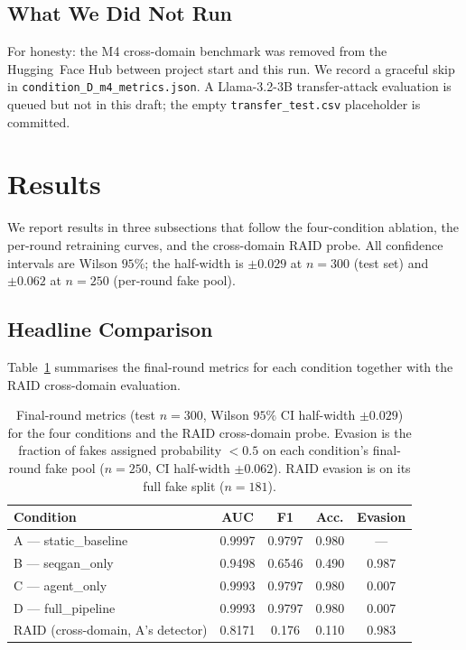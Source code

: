 \documentclass[conference]{IEEEtran}
\begin{document}
\subsection{What We Did Not Run}
For honesty: the M4 \cite{wang2024m4} cross-domain benchmark was removed
from the Hugging~Face Hub between project start and this run. We record a
graceful skip in \texttt{condition\_D\_m4\_metrics.json}. A
Llama-3.2-3B transfer-attack evaluation is queued but not in this draft;
the empty \texttt{transfer\_test.csv} placeholder is committed.

\section{Results}
\label{sec:results}

We report results in three subsections that follow the four-condition
ablation, the per-round retraining curves, and the cross-domain RAID
probe. All confidence intervals are Wilson \(95\%\); the half-width is
\(\pm 0.029\) at \(n = 300\) (test set) and \(\pm 0.062\) at
\(n = 250\) (per-round fake pool).

\subsection{Headline Comparison}
\label{ssec:headline}

Table~\ref{tab:headline} summarises the final-round metrics for each
condition together with the RAID cross-domain evaluation.

\begin{table}[t]
\caption{Final-round metrics (test \(n=300\), Wilson \(95\%\) CI half-width
\(\pm 0.029\)) for the four conditions and the RAID cross-domain probe.
Evasion is the fraction of fakes assigned probability $<0.5$ on each
condition's final-round fake pool (\(n=250\), CI half-width \(\pm 0.062\)).
RAID evasion is on its full fake split (\(n=181\)).}
\label{tab:headline}
\centering
\renewcommand{\arraystretch}{1.15}
\begin{tabular}{@{}lcccc@{}}
\toprule
\textbf{Condition} & \textbf{AUC} & \textbf{F1} & \textbf{Acc.} & \textbf{Evasion} \\
\midrule
A — static\_baseline      & 0.9997 & 0.9797 & 0.980 & --- \\
B — seqgan\_only          & 0.9498 & 0.6546 & 0.490 & 0.987 \\
C — agent\_only           & 0.9993 & 0.9797 & 0.980 & 0.007 \\
D — full\_pipeline        & 0.9993 & 0.9797 & 0.980 & 0.007 \\
\midrule
RAID (cross-domain, A's detector)
                          & 0.8171 & 0.176  & 0.110 & 0.983 \\
\bottomrule
\end{tabular}
\end{table}
\end{document}
